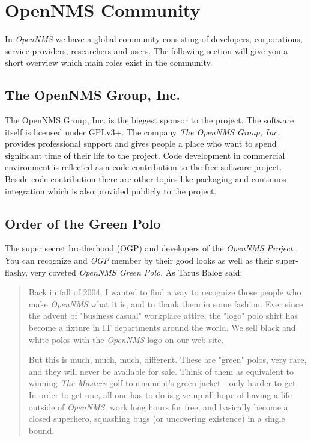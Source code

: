 \section{OpenNMS Community}
In \emph{OpenNMS} we have a global community consisting of developers, corporations, service providers, researchers and users. The following section will give you a short overview which main roles exist in the community.

\subsection*{The OpenNMS Group, Inc.}
The OpenNMS Group, Inc. is the biggest sponsor to the project. The software itself is licensed under GPLv3+. The company \emph{The OpenNMS Group, Inc.} provides professional support and gives people a place who want to spend significant time of their life to the project. Code development in commercial environment is reflected as a code contribution to the free software project. Beside code contribution there are other topics like packaging and continuos integration which is also provided publicly to the project.

\subsection*{Order of the Green Polo}
The super secret brotherhood (OGP) and developers of the \emph{OpenNMS Project}. You can recognize and \emph{OGP} member by their good looks as well as their super-flashy, very coveted \emph{OpenNMS Green Polo}. As Tarus Balog said:
 
\begin{quote}
Back in fall of 2004, I wanted to find a way to recognize those people who make \emph{OpenNMS} what it is, and to thank them in some fashion. 
Ever since the advent of "business casual" workplace attire, the "logo" polo shirt has become a fixture in IT departments around the world. We sell black and white polos with the \emph{OpenNMS} logo on our web site.

But this is much, much, much, different. These are "green" polos, very rare, and they will never be available for sale. Think of them as equivalent to winning \emph{The Masters} golf tournament's green jacket - only harder to get.
In order to get one, all one has to do is give up all hope of having a life outside of \emph{OpenNMS}, work long hours for free, and basically become a closed superhero, squashing bugs (or uncovering existence) in a single bound.
\end{quote}

